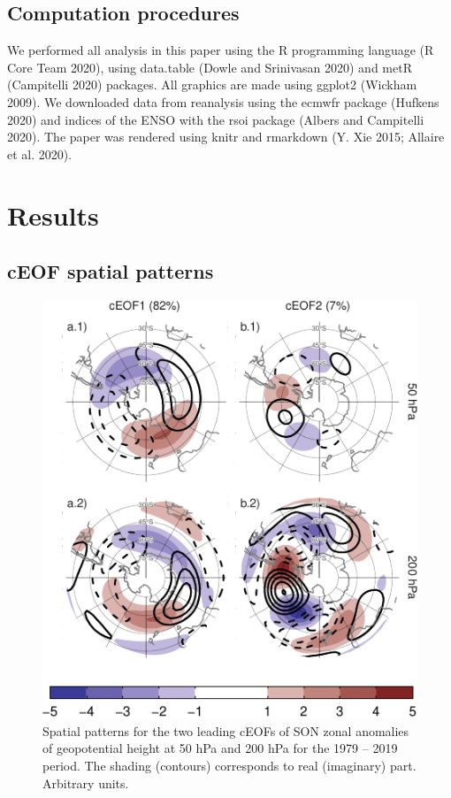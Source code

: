 \documentclass[smallextended]{svjour3}       %
\begin{document}
\hypertarget{computation-procedures}{%
\subsection{Computation procedures}\label{computation-procedures}}

We performed all analysis in this paper using the R programming language (R Core Team 2020), using data.table (Dowle and Srinivasan 2020) and metR (Campitelli 2020) packages. All graphics are made using ggplot2 (Wickham 2009). We downloaded data from reanalysis using the ecmwfr package (Hufkens 2020) and indices of the ENSO with the rsoi package (Albers and Campitelli 2020). The paper was rendered using knitr and rmarkdown (Y. Xie 2015; Allaire et al. 2020).

\hypertarget{results}{%
\section{Results}\label{results}}

\hypertarget{spatial}{%
\subsection{cEOF spatial patterns}\label{spatial}}

\begin{figure}
\centering
\includegraphics{../figures/ceofs-1-1.pdf}
\caption{\label{fig:ceofs-1}Spatial patterns for the two leading cEOFs of SON zonal anomalies of geopotential height at 50 hPa and 200 hPa for the 1979 -- 2019 period. The shading (contours) corresponds to real (imaginary) part. Arbitrary units.}
\end{figure}
\end{document}

